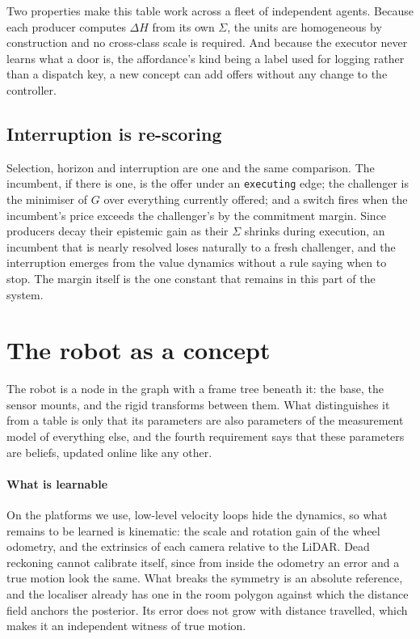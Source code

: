 \documentclass[10pt,twocolumn]{IEEEtran}
\newcommand{\efe}{\ensuremath{G}}
\begin{document}
Two properties make this table work across a fleet of independent agents. Because each producer
computes $\Delta H$ from its own $\Sigma$, the units are homogeneous by construction and no
cross-class scale is required. And because the executor never learns what a door is, the affordance's
kind being a label used for logging rather than a dispatch key, a new concept can add offers without
any change to the controller.

\subsection{Interruption is re-scoring}

Selection, horizon and interruption are one and the same comparison. The incumbent, if there is one,
is the offer under an \texttt{executing} edge; the challenger is the minimiser of $\efe$ over
everything currently offered; and a switch fires when the incumbent's price exceeds the challenger's
by the commitment margin. Since producers decay their epistemic gain as their $\Sigma$ shrinks during
execution, an incumbent that is nearly resolved loses naturally to a fresh challenger, and the
interruption emerges from the value dynamics without a rule saying when to stop. The margin itself is
the one constant that remains in this part of the system.

\section{The robot as a concept}\label{sec:self}

The robot is a node in the graph with a frame tree beneath it: the base, the sensor mounts, and the
rigid transforms between them. What distinguishes it from a table is only that its parameters are also
parameters of the measurement model of everything else, and the fourth requirement says that these
parameters are beliefs, updated online like any other.

\paragraph{What is learnable} On the platforms we use, low-level velocity loops hide the dynamics, so
what remains to be learned is kinematic: the scale and rotation gain of the wheel odometry, and the
extrinsics of each camera relative to the LiDAR. Dead reckoning cannot calibrate itself, since from
inside the odometry an error and a true motion look the same. What breaks the symmetry is an absolute
reference, and the localiser already has one in the room polygon against which the distance field
anchors the posterior. Its error does not grow with distance travelled, which makes it an independent
witness of true motion.
\end{document}
